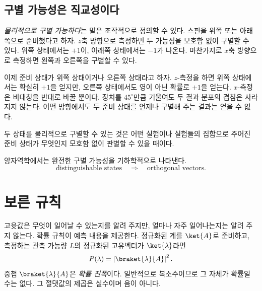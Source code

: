 \subsection{구별 가능성은 직교성이다}

\emph{물리적으로 구별 가능하다}는 말은 조작적으로 정의할 수 있다. 스핀을 위쪽 또는 아래쪽으로 준비했다고 하자. \(z\)축 방향으로 측정하면 두 가능성을 모호함 없이 구별할 수 있다. 위쪽 상태에서는 \(+1\)이, 아래쪽 상태에서는 \(-1\)가 나온다. 마찬가지로 \(x\)축 방향으로 측정하면 왼쪽과 오른쪽을 구별할 수 있다.

이제 준비 상태가 위쪽 상태이거나 오른쪽 상태라고 하자. \(z\)-측정을 하면 위쪽 상태에서는 확실히 \(+1\)을 얻지만, 오른쪽 상태에서도 영이 아닌 확률로 \(+1\)을 얻는다. \(x\)-측정은 비대칭을 반대로 바꿀 뿐이다. 장치를 \(45^\circ\)만큼 기울여도 두 결과 분포의 겹침은 사라지지 않는다. 어떤 방향에서도 두 준비 상태를 언제나 구별해 주는 결과는 얻을 수 없다.

\begin{definition}두 상태를 물리적으로 구별할 수 있는 것은 어떤 실험이나 실험들의 집합으로 주어진 준비 상태가 무엇인지 모호함 없이 판별할 수 있을 때이다.\end{definition}

양자역학에서는 완전한 구별 가능성을 기하학적으로 나타낸다. \begin{equation}
\text{distinguishable states}
\quad\Longrightarrow\quad
\text{orthogonal vectors}.
\end{equation}

\begin{classroomqa}\end{classroomqa}

\section{보른 규칙}

고윳값은 무엇이 일어날 수 있는지를 알려 주지만, 얼마나 자주 일어나는지는 알려 주지 않는다. 확률 규칙이 예측 내용을 제공한다. 정규화된 계를 \(\ket{A}\)로 준비하고, 측정하는 관측 가능량 \(L\)의 정규화된 고유벡터가 \(\ket{\lambda}\)라면 \begin{equation}
P(\lambda)=\left|\braket{\lambda}{A}\right|^2.
\label{eq:l4-born-rule}
\end{equation}중첩 \(\braket{\lambda}{A}\)은 \emph{확률 진폭}이다. 일반적으로 복소수이므로 그 자체가 확률일 수는 없다. 그 절댓값의 제곱은 실수이며 음이 아니다.

